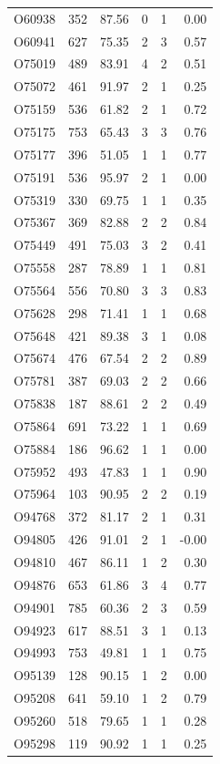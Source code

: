 \begin{longtable}{lrrrrr}
O60938 & 352 & 87.56 & 0 & 1 & 0.00 \\
O60941 & 627 & 75.35 & 2 & 3 & 0.57 \\
O75019 & 489 & 83.91 & 4 & 2 & 0.51 \\
O75072 & 461 & 91.97 & 2 & 1 & 0.25 \\
O75159 & 536 & 61.82 & 2 & 1 & 0.72 \\
O75175 & 753 & 65.43 & 3 & 3 & 0.76 \\
O75177 & 396 & 51.05 & 1 & 1 & 0.77 \\
O75191 & 536 & 95.97 & 2 & 1 & 0.00 \\
O75319 & 330 & 69.75 & 1 & 1 & 0.35 \\
O75367 & 369 & 82.88 & 2 & 2 & 0.84 \\
O75449 & 491 & 75.03 & 3 & 2 & 0.41 \\
O75558 & 287 & 78.89 & 1 & 1 & 0.81 \\
O75564 & 556 & 70.80 & 3 & 3 & 0.83 \\
O75628 & 298 & 71.41 & 1 & 1 & 0.68 \\
O75648 & 421 & 89.38 & 3 & 1 & 0.08 \\
O75674 & 476 & 67.54 & 2 & 2 & 0.89 \\
O75781 & 387 & 69.03 & 2 & 2 & 0.66 \\
O75838 & 187 & 88.61 & 2 & 2 & 0.49 \\
O75864 & 691 & 73.22 & 1 & 1 & 0.69 \\
O75884 & 186 & 96.62 & 1 & 1 & 0.00 \\
O75952 & 493 & 47.83 & 1 & 1 & 0.90 \\
O75964 & 103 & 90.95 & 2 & 2 & 0.19 \\
O94768 & 372 & 81.17 & 2 & 1 & 0.31 \\
O94805 & 426 & 91.01 & 2 & 1 & -0.00 \\
O94810 & 467 & 86.11 & 1 & 2 & 0.30 \\
O94876 & 653 & 61.86 & 3 & 4 & 0.77 \\
O94901 & 785 & 60.36 & 2 & 3 & 0.59 \\
O94923 & 617 & 88.51 & 3 & 1 & 0.13 \\
O94993 & 753 & 49.81 & 1 & 1 & 0.75 \\
O95139 & 128 & 90.15 & 1 & 2 & 0.00 \\
O95208 & 641 & 59.10 & 1 & 2 & 0.79 \\
O95260 & 518 & 79.65 & 1 & 1 & 0.28 \\
O95298 & 119 & 90.92 & 1 & 1 & 0.25 \\

\end{longtable}
